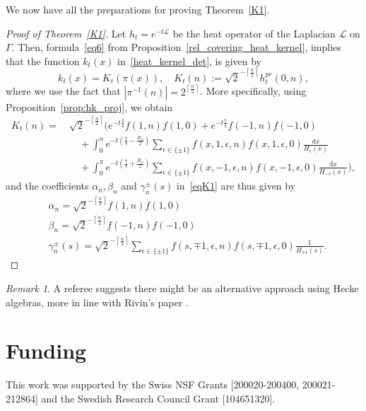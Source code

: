 \documentclass[11pt]{amsart}
\theoremstyle{definition}
\theoremstyle{remark}
\newtheorem{remark}{Remark}
\theoremstyle{plain}
\numberwithin{equation}{section}
\numberwithin{lemma}{section}
\numberwithin{definition}{section}
\numberwithin{proposition}{section}
\numberwithin{corollary}{section}
\numberwithin{theorem}{section}
\numberwithin{remark}{section}
\begin{document}
We now have all the preparations for proving Theorem~\ref{K1}.
\begin{proof}[Proof of Theorem~\ref{K1}]
Let $h_t=e^{-t\mathcal{L}}$ be the heat operator of the Laplacian $\mathcal{L}$ on $\Gamma$. 
Then, formula~\eqref{eq6} from Proposition~\ref{rel_covering_heat_kernel}, implies that the function $k_t(x)$ in~\eqref{heat_kernel_det}, is given by
$$
k_t(x)=K_t(\pi(x)), \quad K_t(n):=\sqrt{2}^{-\left\lceil\frac{n}{2}\right\rceil} h^{pr}_t(0,n),
$$
where we use the fact that $|\pi^{-1}(n)|=2^{\left\lceil\frac{n}{2}\right\rceil}$. More specifically, using Proposition~\ref{prop:hk_proj}, we obtain
\begin{align*}
 K_t(n) 
 = \ & \sqrt{2}^{-\left\lceil\frac{n}{2}\right\rceil} \Big( e^{-t\frac{3}{4}} f(1,n)f(1,0) +e^{-t\frac{7}{4}} f(-1,n)f(-1,0) \\
 & \quad + \int_0^\pi e^{-t(\frac{7}{8}-\frac{R_x}{2})} \sum_{\epsilon\in\{\pm1\}} f(x,1,\epsilon,n) f(x,1,\epsilon,0) \frac{\mathrm{d}x}{H_{\epsilon}(x)} \\
 & \quad + \int_0^\pi e^{-t(\frac{7}{8}+\frac{R_x}{2})} \sum_{\epsilon\in\{\pm1\}} f(x,-1,\epsilon,n) f(x,-1,\epsilon,0) \frac{\mathrm{d}x}{H_{-\epsilon}(x)} \Big),
\end{align*}
and the coefficients $\alpha_n, \beta_n$ and $\gamma_n^{\pm}(s)$ in~\eqref{eqK1} are thus given by
\begin{align*}
 & \alpha_n = \sqrt{2}^{-\left\lceil\frac{n}{2}\right\rceil} f(1,n)f(1,0) \\
 & \beta_n = \sqrt{2}^{-\left\lceil\frac{n}{2}\right\rceil} f(-1,n)f(-1,0) \\
 & \gamma_n^{\pm}(s) = \sqrt{2}^{-\left\lceil\frac{n}{2}\right\rceil} \sum_{\epsilon\in\{\pm1\}} f(s,\mp1,\epsilon,n) f(s,\mp1,\epsilon,0) \frac{1}{H_{\mp\epsilon}(s)}.
\end{align*}
\end{proof}

\begin{remark}
  A referee suggests there might be an alternative approach using Hecke algebras, more in line with Rivin's paper \cite{MR2587834}.
\end{remark}

\section*{Funding}
This work was supported by the Swiss NSF Grants [200020-200400, 200021-212864] and the Swedish Research Council Grant [104651320].
\end{document}
